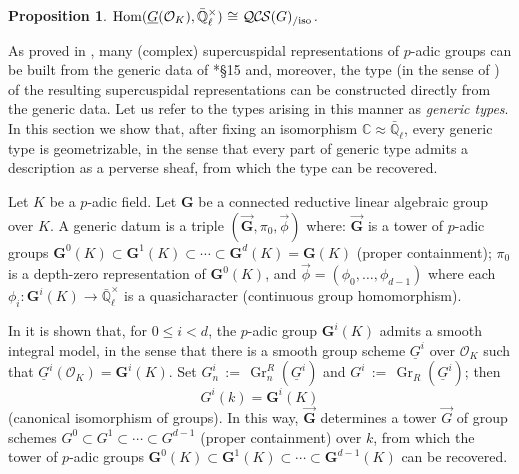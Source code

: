 \documentclass[10pt]{amsart}
\theoremstyle{plain}
\newtheorem{proposition}[theorem]{Proposition}
\theoremstyle{definition}
\newcommand{\CC}{{\mathbb{C}}}
\newcommand{\EE}{\mathbb{\bar Q}_\ell}
\newcommand{\OK}{\mathcal{O}_K}
\newcommand{\Fq}{k}
\newcommand{\EEx}{\EE^\times}
\newcommand{\G}{\textbf{G}}
\DeclareMathOperator{\Hom}{Hom}
\DeclareMathOperator{\Gr}{Gr}
\newcommand{\ceq}{{\, :=\, }}
\newcommand{\iso}{{\ \cong\ }}
\newcommand{\QCS}{{\mathcal{QC\hskip-0.8pt S}}}
\newcommand{\QCSiso}[1]{\QCS(#1)_{/\text{iso}}}
\begin{document}
\begin{proposition}\label{prop:QCS}
$\Hom(\underline{G}(\OK),\EEx) \iso \QCSiso{G}$.
\end{proposition}

 


As proved in \cite{kim:07a}, many (complex) supercuspidal representations of $p$-adic groups can be built from the generic data of \cite{yu:01a}*{\S 15} and, moreover, the type (in the sense of \cite{bushnell-kutzko:98a}) of the resulting supercuspidal representations can be constructed directly from the generic data. 
Let us refer to the types arising in this manner as {\it generic types}.
In this section we show that, after fixing an isomorphism $\CC \approx \EE$, every generic type is geometrizable, in the sense that every part of generic type admits a description as a perverse sheaf, from which the type can be recovered.

Let $K$ be a $p$-adic field. Let $\G$ be a connected reductive linear algebraic group over $K$. 
A generic datum is a triple $(\vec{\G}, \pi_0, \vec{\phi})$ where: $\vec{\G}$ is a tower of $p$-adic groups $\G^0(K) \subset \G^1(K) \subset \cdots  \subset \G^d(K) = \G(K)$ (proper containment); $\pi_0$ is a depth-zero representation of $\G^0(K)$, and $\vec{\phi} = (\phi_0, \ldots , \phi_{d-1})$ where each $\phi_i : \G^i(K) \to \EEx$ is a quasicharacter (continuous group homomorphism).  


In \cite{yu:03a} it is shown that, for $0 \leq i < d$, the $p$-adic group $\G^i(K)$ admits a smooth integral model, in the sense that there is a smooth group scheme $\underline{G}^i$ over $\OK$ such that $\underline{G}^i(\OK) = \G^i(K)$.
Set $G^i_n \ceq \Gr^R_n(\underline{G}^i)$ and $G^i \ceq \Gr_R(\underline{G}^i)$; 
then \[G^i(\Fq) = \G^i(K)\] (canonical isomorphism of groups).
In this way, $\vec{\G}$ determines a tower $\vec{G}$ of group schemes $G^0 \subset G^1 \subset \cdots  \subset G^{d-1}$ (proper containment) over $\Fq$, from which the tower of $p$-adic groups
$\G^0(K) \subset \G^1(K) \subset \cdots  \subset \G^{d-1}(K)$ can be recovered.
\end{document}
